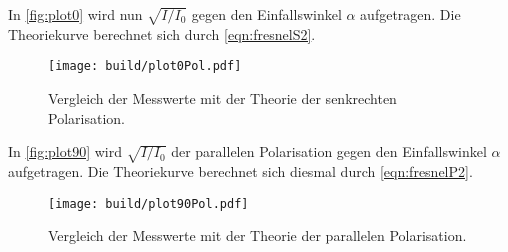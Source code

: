 In \autoref{fig:plot0} wird nun $\sqrt{I/I_0}$ gegen den Einfallswinkel $\alpha$ aufgetragen. Die Theoriekurve berechnet sich durch \autoref{eqn:fresnelS2}. 
\begin{figure}
    \centering
    \texttt{[image: build/plot0Pol.pdf]}
    \caption{Vergleich der Messwerte mit der Theorie der senkrechten Polarisation.}
    \label{fig:plot0}
\end{figure}

In \autoref{fig:plot90} wird $\sqrt{I/I_0}$ der parallelen Polarisation gegen den Einfallswinkel $\alpha$ aufgetragen. Die Theoriekurve berechnet sich diesmal 
durch \autoref{eqn:fresnelP2}.
\begin{figure}
    \centering
    \texttt{[image: build/plot90Pol.pdf]}
    \caption{Vergleich der Messwerte mit der Theorie der parallelen Polarisation.}
    \label{fig:plot90}
\end{figure}
